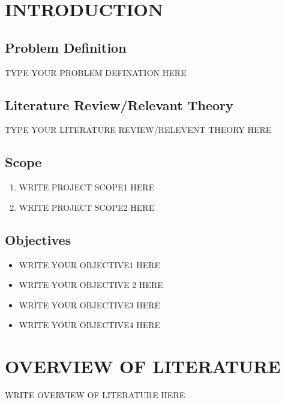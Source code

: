 \documentclass[12pt]{report}	%
\begin{document}
	\thisfancypage{\setlength{\fboxsep}{10pt}\doublebox}{}	

\listoffigures
	\thisfancypage{\setlength{\fboxsep}{10pt}\doublebox}{}	


\newpage
	\thisfancypage{\setlength{\fboxsep}{10pt}\doublebox}{}	


	\thisfancypage{\setlength{\fboxsep}{10pt}\doublebox}{}	
\listoftables
	\thisfancypage{\setlength{\fboxsep}{10pt}\doublebox}{}	


\chapter{INTRODUCTION}
\section{Problem Definition}
TYPE YOUR PROBLEM DEFINATION HERE

\section{Literature Review/Relevant Theory}
TYPE YOUR LITERATURE REVIEW/RELEVENT THEORY HERE


\section{Scope}
\begin{enumerate}
\item WRITE PROJECT SCOPE1 HERE
\item WRITE PROJECT SCOPE2 HERE

\end{enumerate}

\section{Objectives}
\begin{itemize}
 \item WRITE YOUR OBJECTIVE1 HERE
\item WRITE YOUR OBJECTIVE 2 HERE
\item WRITE YOUR OBJECTIVE3 HERE
\item WRITE YOUR OBJECTIVE4 HERE

\end{itemize}

\chapter{OVERVIEW OF LITERATURE}
WRITE  OVERVIEW OF LITERATURE HERE
\end{document}
